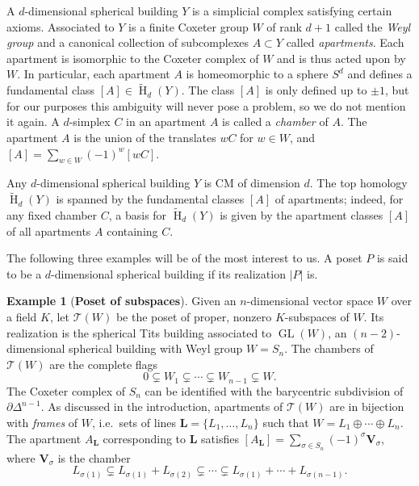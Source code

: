 \documentclass[11 pt]{article}
\theoremstyle{plain}
\theoremstyle{definition}
\newtheorem{example}[theorem]{Example}
\numberwithin{equation}{section}
\DeclareMathOperator{\GL}{GL}
\DeclareMathOperator{\HH}{H}
\newcommand\Tits{\ensuremath{\mathcal{T}}}
\newcommand\LL{\mathbf{L}}
\newcommand\VV{\mathbf{V}}
\newcommand\abs[1]{\left\lvert#1\right\rvert}
\begin{document}
A $d$-dimensional spherical building $Y$ is a simplicial complex satisfying certain axioms.  
Associated to $Y$ is a finite Coxeter group $W$ of rank $d+1$ called the
\emph{Weyl group} and a canonical collection 
of subcomplexes $A\subset Y$ called \emph{apartments}.  Each 
apartment is isomorphic to the 
Coxeter complex of $W$ and is thus acted upon by $W$.  
In particular, each apartment $A$ is homeomorphic to a  sphere 
$S^d$ and defines a fundamental class $[A]\in \widetilde{\HH}_d(Y)$. 
The class $[A]$ is only defined up to $\pm1$, but for our purposes this ambiguity will never pose a problem, so we do not mention it again.  
A $d$-simplex $C$ in an apartment $A$ is called a \emph{chamber} of $A$.   The apartment $A$ is 
the union of the translates $wC$ for $w\in W$, and 
$[A]= \sum_{w\in W}(-1)^w [wC]$. 

Any $d$-dimensional spherical building $Y$ is CM of dimension $d$. %
The top homology $\widetilde{\HH}_d(Y)$ is 
spanned by the fundamental classes $[A]$ of apartments; indeed, for any fixed chamber $C$, a basis for $\widetilde{\HH}_d(Y)$ is given by the apartment classes $[A]$ of all apartments $A$ containing $C$.

The following three examples will be of the most interest to us. A poset $P$ is said to be a $d$-dimensional spherical building if its realization $\abs{P}$ is.

\begin{example}[{\bf Poset of subspaces}]
\label{ex:Titsbuilding}
Given an $n$-dimensional vector space $W$ over a field $K$, let $\Tits(W)$ be the poset of proper, nonzero $K$-subspaces of $W$. Its realization is the spherical Tits building associated to $\GL(W)$, an $(n-2)$-dimensional spherical building with Weyl group $W=S_n$. 
The chambers of $\Tits(W)$ are the complete flags
\[0 \subsetneq W_1 \subsetneq \cdots \subsetneq W_{n-1} \subsetneq W.\]
The Coxeter complex of $S_n$ can be identified with 
the barycentric subdivision of $\partial \Delta^{n-1}$.  As 
discussed in the introduction, apartments of $\Tits(W)$ are in bijection 
with \emph{frames} of $W$, i.e.\ sets of lines $\LL=\{L_1,\ldots,L_n\}$ 
such that $W=L_1\oplus \cdots\oplus L_n$.  The apartment $A_{\LL}$ corresponding
to $\LL$ satisfies $[A_{\LL}] = \sum_{\sigma \in S_n} (-1)^{\sigma} \VV_{\sigma}$,
where $\VV_{\sigma}$ is the chamber
\begin{equation}
\label{eq:Titschambers}
L_{\sigma(1)} \subsetneq  L_{\sigma(1)}+L_{\sigma(2)} \subsetneq
\cdots \subsetneq L_{\sigma(1)}+\cdots+L_{\sigma(n-1)}.
\end{equation}
\end{example}
\end{document}
